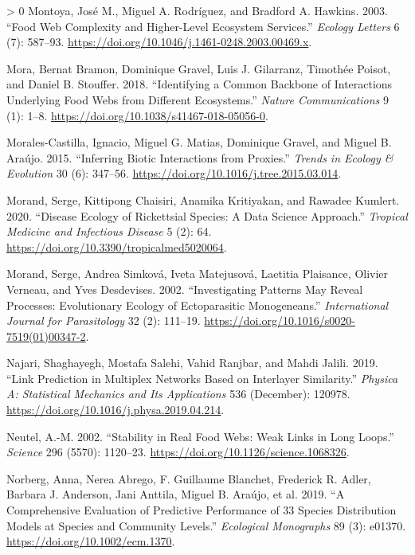 \documentclass[11pt]{article}
\newlength{\cslhangindent}
\newenvironment{CSLReferences}[3] %
 {%
  \setlength{\parindent}{0pt}
  \ifodd #1 \everypar{\setlength{\hangindent}{\cslhangindent}}\ignorespaces\fi
  \ifnum #2 > 0
  \setlength{\parskip}{#2\baselineskip}
  \fi
 }%
 {}
\begin{document}
\begin{CSLReferences}{1}{0}
\leavevmode\hypertarget{ref-Montoya2003FooWeb}{}%
Montoya, José M., Miguel A. Rodríguez, and Bradford A. Hawkins. 2003.
{``Food Web Complexity and Higher-Level Ecosystem Services.''}
\emph{Ecology Letters} 6 (7): 587--93.
\url{https://doi.org/10.1046/j.1461-0248.2003.00469.x}.

\leavevmode\hypertarget{ref-Mora2018IdeCom}{}%
Mora, Bernat Bramon, Dominique Gravel, Luis J. Gilarranz, Timothée
Poisot, and Daniel B. Stouffer. 2018. {``Identifying a Common Backbone
of Interactions Underlying Food Webs from Different Ecosystems.''}
\emph{Nature Communications} 9 (1): 1--8.
\url{https://doi.org/10.1038/s41467-018-05056-0}.

\leavevmode\hypertarget{ref-Morales-Castilla2015InfBio}{}%
Morales-Castilla, Ignacio, Miguel G. Matias, Dominique Gravel, and
Miguel B. Araújo. 2015. {``Inferring Biotic Interactions from
Proxies.''} \emph{Trends in Ecology \& Evolution} 30 (6): 347--56.
\url{https://doi.org/10.1016/j.tree.2015.03.014}.

\leavevmode\hypertarget{ref-Morand2020DisEco}{}%
Morand, Serge, Kittipong Chaisiri, Anamika Kritiyakan, and Rawadee
Kumlert. 2020. {``Disease Ecology of Rickettsial Species: A Data Science
Approach.''} \emph{Tropical Medicine and Infectious Disease} 5 (2): 64.
\url{https://doi.org/10.3390/tropicalmed5020064}.

\leavevmode\hypertarget{ref-Morand2002InvPat}{}%
Morand, Serge, Andrea Simková, Iveta Matejusová, Laetitia Plaisance,
Olivier Verneau, and Yves Desdevises. 2002. {``Investigating Patterns
May Reveal Processes: Evolutionary Ecology of Ectoparasitic
Monogeneans.''} \emph{International Journal for Parasitology} 32 (2):
111--19. \url{https://doi.org/10.1016/s0020-7519(01)00347-2}.

\leavevmode\hypertarget{ref-Najari2019LinPre}{}%
Najari, Shaghayegh, Mostafa Salehi, Vahid Ranjbar, and Mahdi Jalili.
2019. {``Link Prediction in Multiplex Networks Based on Interlayer
Similarity.''} \emph{Physica A: Statistical Mechanics and Its
Applications} 536 (December): 120978.
\url{https://doi.org/10.1016/j.physa.2019.04.214}.

\leavevmode\hypertarget{ref-Neutel2002StaRea}{}%
Neutel, A.-M. 2002. {``Stability in Real Food Webs: Weak Links in Long
Loops.''} \emph{Science} 296 (5570): 1120--23.
\url{https://doi.org/10.1126/science.1068326}.

\leavevmode\hypertarget{ref-Norberg2019ComEva}{}%
Norberg, Anna, Nerea Abrego, F. Guillaume Blanchet, Frederick R. Adler,
Barbara J. Anderson, Jani Anttila, Miguel B. Araújo, et al. 2019. {``A
Comprehensive Evaluation of Predictive Performance of 33 Species
Distribution Models at Species and Community Levels.''} \emph{Ecological
Monographs} 89 (3): e01370. \url{https://doi.org/10.1002/ecm.1370}.


\end{CSLReferences}
\end{document}
